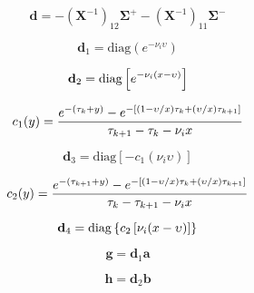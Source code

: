\begin{equation}
\mathbf{d} = -(\mathbf{X}^{-1})_{12}\mathbf{\Sigma}^{+} - (\mathbf{X}^{-1})_{11}\mathbf{\Sigma}^{-}
\label{eq:mem-radiance_at_optical_depth-forward-d}
\end{equation}

\begin{equation}
\mathbf{d}_{1} = \mathrm{diag}(e^{-\nu_{i}\upsilon})
\label{eq:mem-radiance_at_optical_depth-forward-d1}
\end{equation}

\begin{equation}
\mathbf{d}_{2} = \mathrm{diag}\left[e^{-\nu_{i}(x - \upsilon)}\right]
\label{eq:mem-radiance_at_optical_depth-forward-d2}
\end{equation}

\begin{equation}
c_{1}(y) = \frac{e^{-(\tau_{k} + y)} - e^{-\left[(1 - \upsilon / x)\tau_{k} + (\upsilon / x)\tau_{k+1}\right]}}{\tau_{k+1} - \tau_{k} - \nu_{i}x}
\label{eq:mem-radiance_at_optical_depth-forward-c1}
\end{equation}

\begin{equation}
\mathbf{d}_{3} = \mathrm{diag}\left[-c_{1}(\nu_{i}\upsilon)\right]
\label{eq:mem-radiance_at_optical_depth-forward-d3}
\end{equation}

\begin{equation}
c_{2}(y) = \frac{e^{-(\tau_{k+1} + y)} - e^{-\left[(1 - \upsilon / x)\tau_{k} + (\upsilon / x)\tau_{k+1}\right]}}{\tau_{k} - \tau_{k+1} - \nu_{i}x}
\label{eq:mem-radiance_at_optical_depth-forward-c1}
\end{equation}

\begin{equation}
\mathbf{d}_{4} = \mathrm{diag}\left\{c_{2}\left[\nu_{i}(x - \upsilon)\right]\right\}
\label{eq:mem-radiance_at_optical_depth-forward-d4}
\end{equation}

\begin{equation}
\mathbf{g} = \mathbf{d}_{1}\mathbf{a}
\label{eq:mem-radiance_at_optical_depth-forward-g}
\end{equation}

\begin{equation}
\mathbf{h} = \mathbf{d}_{2}\mathbf{b}
\label{eq:mem-radiance_at_optical_depth-forward-h}
\end{equation}

